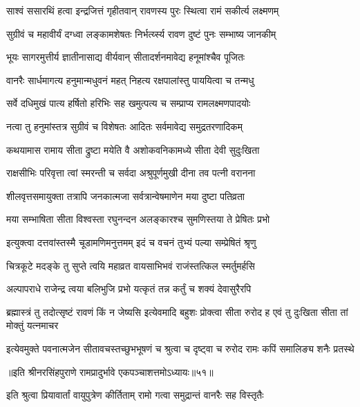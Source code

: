 \twolineshloka
{साश्वं ससारथिं हत्वा इन्द्रजित्तं गृहीतवान्}
{रावणस्य पुरः स्थित्वा रामं सकीर्त्य लक्ष्मणम्} %

\twolineshloka
{सुग्रीवं च महावीर्यं दग्ध्वा लङ्कामशेषतः}
{निर्भर्त्य्स्य रावण दुष्टं पुनः सम्भाष्य जानकीम्} %

\twolineshloka
{भूयः सागरमुत्तीर्य ज्ञातीनासाद्य वीर्यवान्}
{सीतादर्शनमावेद्य हनूमांश्चैव पूजितः} %

\twolineshloka
{वानरैः सार्धमागत्य हनुमान्मधुवनं महत्}
{निहत्य रक्षपालांस्तु पाययित्वा च तन्मधु} %

\twolineshloka
{सर्वे दधिमुखं पात्य हर्षितो हरिभिः सह}
{खमुत्पत्य च सम्प्राप्य रामलक्ष्मणपादयोः} %

\twolineshloka
{नत्वा तु हनुमांस्तत्र सुग्रीवं च विशेषतः}
{आदितः सर्वमावेद्य समुद्रतरणादिकम्} %

\twolineshloka
{कथयामास रामाय सीता द्रुष्टा मयेति वै}
{अशोकवनिकामध्ये सीता देवी सुदुःखिता} %

\twolineshloka
{राक्षसीभिः परिवृत्ता त्वां स्मरन्ती च सर्वदा}
{अश्रुपूर्णमुखी दीना तव पत्नी वरानना} %

\twolineshloka
{शीलवृत्तसमायुक्ता तत्रापि जनकात्मजा}
{सर्वत्रान्वेषमाणेन मया दुष्टा पतिव्रता} %

\twolineshloka
{मया सम्भाषिता सीता विश्वस्ता रघुनन्दन}
{अलङ्कारश्च सुमणिस्तया ते प्रेषितः प्रभो} %

\twolineshloka
{इत्युक्त्वा दत्तवांस्तस्मै चूडामणिमनुत्तमम्}
{इदं च वचनं तुभ्यं पल्या सम्प्रेषितं श्रृणु} %

\twolineshloka
{चित्रकूटे मदङ्के तु सुप्ते त्वयि महाव्रत}
{वायसाभिभवं राजंस्तत्किल स्मर्तुमर्हसि} %

\twolineshloka
{अल्पापराधे राजेन्द्र त्वया बलिभुजि प्रभो}
{यत्कृतं तन्न कर्तुं च शक्यं देवासुरैरपि} %

\threelineshloka
{ब्रह्मास्त्रं तु तदोत्सृष्टं रावणं किं न जेष्यसि}
{इत्येवमादि बहुशः प्रोक्त्वा सीता रुरोद ह}
{एवं तु दुःखिता सीता तां मोक्तुं यत्नमाचर} %

\fourlineindentedshloka
{इत्येवमुक्ते पवनात्मजेन}
{सीतावचस्तच्छुभभूषणं च}
{श्रुत्वा च दृष्ट्वा च रुरोद रामः}
{कपिं समालिङ्य शनैः प्रतस्थे} %

॥इति श्रीनरसिंहपुराणे रामप्रादुर्भावे एकपञ्चाशत्तमोऽध्यायः॥५१॥



\twolineshloka
{इति श्रुत्वा प्रियावार्तां वायुपुत्रेण कीर्तिताम्}
{रामो गत्वा समुद्रान्तं वानरैः सह विस्तृतैः} %

